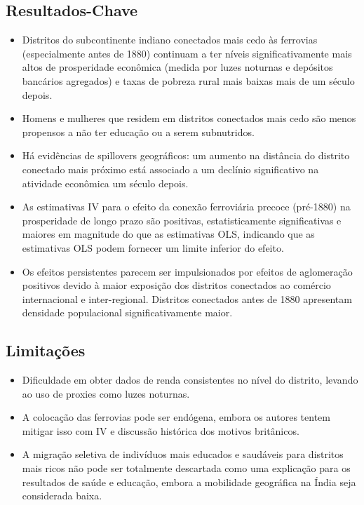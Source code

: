 \documentclass[12pt]{article}
\begin{document}
\subsection*{Resultados-Chave}
\begin{itemize}
    \item Distritos do subcontinente indiano conectados mais cedo às ferrovias (especialmente antes de 1880) continuam a ter níveis significativamente mais altos de prosperidade econômica (medida por luzes noturnas e depósitos bancários agregados) e taxas de pobreza rural mais baixas mais de um século depois.
    \item Homens e mulheres que residem em distritos conectados mais cedo são menos propensos a não ter educação ou a serem subnutridos.
    \item Há evidências de spillovers geográficos: um aumento na distância do distrito conectado mais próximo está associado a um declínio significativo na atividade econômica um século depois.
    \item As estimativas IV para o efeito da conexão ferroviária precoce (pré-1880) na prosperidade de longo prazo são positivas, estatisticamente significativas e maiores em magnitude do que as estimativas OLS, indicando que as estimativas OLS podem fornecer um limite inferior do efeito.
    \item Os efeitos persistentes parecem ser impulsionados por efeitos de aglomeração positivos devido à maior exposição dos distritos conectados ao comércio internacional e inter-regional. Distritos conectados antes de 1880 apresentam densidade populacional significativamente maior.
\end{itemize}

\subsection*{Limitações}
\begin{itemize}
    \item Dificuldade em obter dados de renda consistentes no nível do distrito, levando ao uso de proxies como luzes noturnas.
    \item A colocação das ferrovias pode ser endógena, embora os autores tentem mitigar isso com IV e discussão histórica dos motivos britânicos.
    \item A migração seletiva de indivíduos mais educados e saudáveis para distritos mais ricos não pode ser totalmente descartada como uma explicação para os resultados de saúde e educação, embora a mobilidade geográfica na Índia seja considerada baixa.
\end{itemize}
\end{document}
